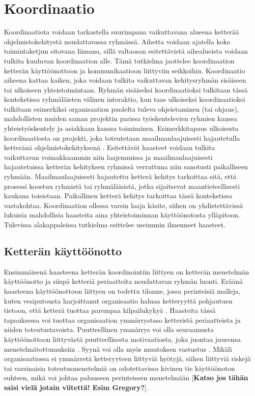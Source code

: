 \chapter{Koordinaatio}

Koordinaatiota voidaan tarkastella suurimpana vaikuttavana alueena ketterää ohjelmistokehitystä noudattavassa ryhmässä. Aihetta voidaan ajatella koko toimintaketjun sitovana liimana, sillä valtaosan esitettävistä aihealueista voidaan tulkita kuuluvan koordinaation alle. Tämä tutkielma jaottelee koordinaation ketterän käyttöönottoon ja kommunikaatioon liittyviin seikkoihin. Koordinaatio aiheena kattaa kaiken, joka voidaan tulkita vaikuttavan kehitysryhmän sisäiseen tai ulkoiseen yhteistoimintaan. Ryhmän sisäiseksi koordinaatioksi tulkitaan tässä kontekstissa ryhmäläisten välinen interaktio, kun taas ulkoiseksi koordinaatioksi tulkitaan esimerkiksi organisaation puolelta tuleva ohjeistaminen (tai ohjaus), mahdollisten muiden saman projektin parissa työskentelevien ryhmien kanssa yhteistyöskentely ja asiakkaan kanssa toimiminen. Esimerkkitapaus ulkoisesta koordinaatiosta on projekti, joka toteutetaan maailmanlaajuisesti hajautetulla ketteränä ohjelmistokehityksenä \cite{ALZOUBI201622}. Esitettävät haasteet voidaan tulkita vaikuttavan voimakkaammin niin laajemmissa ja maailmanlaajuisesti hajautetuissa ketterän kehityksen ryhmissä verrattuna niin sanotusti paikalliseen ryhmään. Maailmanlaajuisesti hajautettu ketterä kehitys tarkoittaa sitä, että prosessi koostuu ryhmistä tai ryhmäläisistä, jotka sijaitsevat maantieteellisesti kaukana toisistaan. Paikallinen ketterä kehitys tarkoittaa tässä kontekstissa vastakohtaa. Koordinaation ollessa varsin laaja käsite, siihen on yhdistettävissä lukuisia mahdollisia haasteita aina yhteistoiminnan käyttöönotosta ylläpitoon. Tulevissa alakappaleissa tutkielma esittelee useimmin ilmenneet haasteet.

\section{Ketterän käyttöönotto}

Ensimmäisenä haasteena ketterän koordinointiin liittyen on ketterän menetelmän käyttöönotto ja siispä ketteriä periaatteita noudattavan ryhmän luonti. Eräänä haasteena käyttöönottoon liittyen on todettu tilanne, jossa perinteisiä malleja, kuten vesiputousta harjoittanut organisaatio haluaa ketteryyttä pohjautuen tietoon, että ketterä tuottaa parempaa kilpailukykyä \cite{MCKNIGHT2014168}. Haasteita tässä tapauksessa voi tuottaa organisaation ymmärrystaso ketteristä periaatteista ja niiden toteutustavoista. Puutteellinen ymmärrys voi olla seuraamusta käyttöönottoon liittyvästä puutteellisesta motivaatiosta, joka juontaa juurensa menetelmätottumuksiin \cite{GREGORY201692}. Syynä voi olla myös muutoksen vastustus \cite{SELLERISILVA201520}. Mikäli organisaatiossa ei ymmärretä ketteryyteen liittyviä hyötyjä, siihen liittyviä riskejä tai varsinaisia toteutusmenetelmiä on odotettavissa kivinen tie käyttöönoton suhteen, mikä voi johtaa paluuseen perinteiseen menetelmään [\textbf{Katso jos tähän saisi vielä jotain viitettä! Esim Gregory?}].

